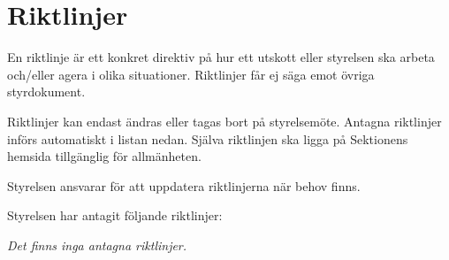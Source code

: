 \documentclass[10pt]{article}
\begin{document}
\section{Riktlinjer}
En riktlinje är ett konkret direktiv på hur ett utskott eller styrelsen ska arbeta och/eller agera i olika situationer. Riktlinjer får ej säga emot övriga styrdokument.

Riktlinjer kan endast ändras eller tagas bort på styrelsemöte. Antagna riktlinjer införs automatiskt i listan nedan. Själva riktlinjen ska ligga på Sektionens hemsida tillgänglig för allmänheten.

Styrelsen ansvarar för att uppdatera riktlinjerna när behov finns.

Styrelsen har antagit följande riktlinjer:

\emph{Det finns inga antagna riktlinjer.}

\begin{comment}
\begin{dashlist}
    \item {[...]}
\end{dashlist}
\end{comment}

\clearpage
\end{document}
